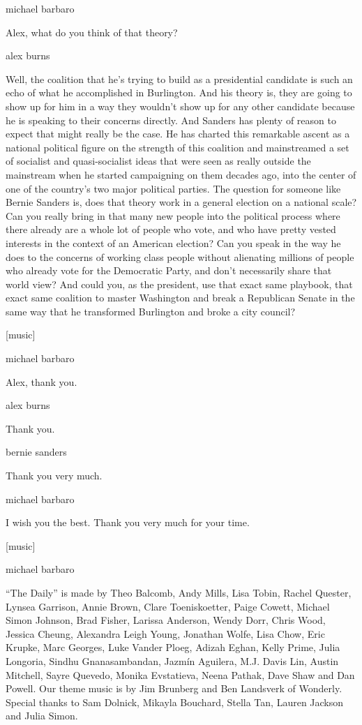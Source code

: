 michael barbaro

Alex, what do you think of that theory?

alex burns

Well, the coalition that he's trying to build as a presidential
candidate is such an echo of what he accomplished in Burlington. And his
theory is, they are going to show up for him in a way they wouldn't show
up for any other candidate because he is speaking to their concerns
directly. And Sanders has plenty of reason to expect that might really
be the case. He has charted this remarkable ascent as a national
political figure on the strength of this coalition and mainstreamed a
set of socialist and quasi-socialist ideas that were seen as really
outside the mainstream when he started campaigning on them decades ago,
into the center of one of the country's two major political parties. The
question for someone like Bernie Sanders is, does that theory work in a
general election on a national scale? Can you really bring in that many
new people into the political process where there already are a whole
lot of people who vote, and who have pretty vested interests in the
context of an American election? Can you speak in the way he does to the
concerns of working class people without alienating millions of people
who already vote for the Democratic Party, and don't necessarily share
that world view? And could you, as the president, use that exact same
playbook, that exact same coalition to master Washington and break a
Republican Senate in the same way that he transformed Burlington and
broke a city council?

{[}music{]}

michael barbaro

Alex, thank you.

alex burns

Thank you.

bernie sanders

Thank you very much.

michael barbaro

I wish you the best. Thank you very much for your time.

{[}music{]}

michael barbaro

``The Daily'' is made by Theo Balcomb, Andy Mills, Lisa Tobin, Rachel
Quester, Lynsea Garrison, Annie Brown, Clare Toeniskoetter, Paige
Cowett, Michael Simon Johnson, Brad Fisher, Larissa Anderson, Wendy
Dorr, Chris Wood, Jessica Cheung, Alexandra Leigh Young, Jonathan Wolfe,
Lisa Chow, Eric Krupke, Marc Georges, Luke Vander Ploeg, Adizah Eghan,
Kelly Prime, Julia Longoria, Sindhu Gnanasambandan, Jazmín Aguilera,
M.J. Davis Lin, Austin Mitchell, Sayre Quevedo, Monika Evstatieva, Neena
Pathak, Dave Shaw and Dan Powell. Our theme music is by Jim Brunberg and
Ben Landsverk of Wonderly. Special thanks to Sam Dolnick, Mikayla
Bouchard, Stella Tan, Lauren Jackson and Julia Simon.

